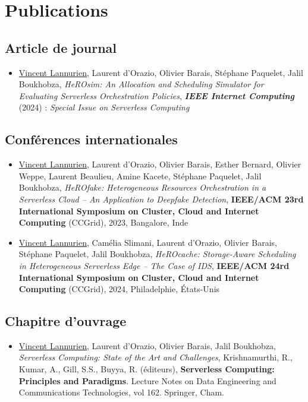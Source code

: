 \chapter*{Publications}

\section*{Article de journal}

\begin{itemize}
    \item \underline{Vincent Lannurien}, Laurent d'Orazio, Olivier Barais, Stéphane Paquelet, Jalil Boukhobza, \textit{{\NoAutoSpacing HeROsim:} An Allocation and Scheduling Simulator for Evaluating Serverless Orchestration Policies}, \textit{\textbf{IEEE Internet Computing}} (2024) : \textit{Special Issue on Serverless Computing}
\end{itemize}

\section*{Conférences internationales}

\begin{itemize}
    \item \underline{Vincent Lannurien}, Laurent d'Orazio, Olivier Barais, Esther Bernard, Olivier Weppe, Laurent Beaulieu, Amine Kacete, Stéphane Paquelet, Jalil Boukhobza, \textit{{\NoAutoSpacing HeROfake:} Heterogeneous Resources Orchestration in a Serverless Cloud -- An Application to Deepfake Detection}, \textbf{IEEE/ACM 23rd International Symposium on Cluster, Cloud and Internet Computing} (CCGrid), 2023, Bangalore, Inde
    \item \underline{Vincent Lannurien}, Camélia Slimani, Laurent d'Orazio, Olivier Barais, Stéphane Paquelet, Jalil Boukhobza, \textit{{\NoAutoSpacing HeROcache:} Storage-Aware Scheduling in Heterogeneous Serverless Edge – The Case of IDS}, \textbf{IEEE/ACM 24rd International Symposium on Cluster, Cloud and Internet Computing} (CCGrid), 2024, Philadelphie, États-Unis
\end{itemize}

\section*{Chapitre d'ouvrage}

\begin{itemize}
    \item \underline{Vincent Lannurien}, Laurent d'Orazio, Olivier Barais, Jalil Boukhobza, \textit{{\NoAutoSpacing Serverless Computing:} State of the Art and Challenges}, Krishnamurthi, R., Kumar, A., Gill, S.S., Buyya, R. (éditeurs), \textbf{{\NoAutoSpacing Serverless Computing:} Principles and Paradigms}. Lecture Notes on Data Engineering and Communications Technologies, vol 162. Springer, Cham.
\end{itemize}
